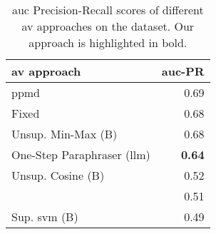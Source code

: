 \begin{table}[h]
\centering
\label{tab:auc_pr}
\caption[\ac{auc} Precision-Recall results]{\ac{auc} Precision-Recall scores of different \ac{av} approaches on the \dataStudent{} dataset. 
Our approach is highlighted in bold.
}
\begin{tabular}{lr}
\toprule
\ac{av} approach           & \ac{auc}-PR \\
\midrule
\acs{ppmd}                       & 0.69   \\
Fixed                      & 0.68   \\
Unsup. Min-Max (B)         & 0.68   \\
One-Step Paraphraser (\ac{llm}) & \textbf{0.64}   \\
Unsup. Cosine (B)          & 0.52   \\
\unmasking{}                  & 0.51   \\
Sup. \ac{svm} (B)               & 0.49  \\
\bottomrule
\end{tabular}%
\end{table}


